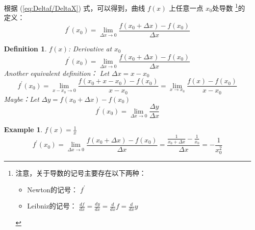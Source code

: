 \documentclass{ctexart}
\numberwithin{equation}{section}
\numberwithin{figure}{section}
\newtheorem{myEx}{Example}[section] %
\newtheorem{myDef}{Definition}[section]
\begin{document}
根据 (\ref{eq:Deltaf/DeltaX}) 式，可以得到，曲线 \(f(x)\) 上任意一点 \(x_0\)处导数
\footnote{注意，关于导数的记号主要存在以下两种：
    \begin{itemize}
        \item Newton的记号：
              \( f^{\prime} \)
        \item Leibniz的记号：
              \( \frac{df}{dx}=\frac{dy}{dx}=\frac{d}{dx}f=\frac{d}{dx}y \)
    \end{itemize}}的定义：
\begin{equation}
    f^{\prime}(x_0) = \lim\limits_{\Delta x \to 0}\frac{f(x_0 + \Delta x) - f(x_0)}{\Delta x}
\end{equation}

\begin{myDef}\label{Def:Derivative}
    \(f(x)\): Derivative at \(x_0\)
    \begin{equation*}
        f^{\prime}(x_0) = \lim\limits_{\Delta x \to 0}\frac{f(x_0 + \Delta x) - f(x_0)}{\Delta x}
    \end{equation*}
    Another equivalent definition：
    Let \(\Delta x = x - x_0\)
    \begin{equation*}
        f^{\prime}(x_0) = \lim\limits_{ x - x_0 \to 0}\frac{f(x_0 +  x - x_0) - f(x_0)}{ x - x_0} = \lim\limits_{ x \to x_0}\frac{f(x) - f(x_0)}{ x - x_0}
    \end{equation*}
    Maybe：Let \(\Delta y = f(x_0 + \Delta x) - f(x_0)\)
    \begin{equation*}
        f^{\prime}(x_0) = \lim\limits_{\Delta x \to 0}\frac{\Delta y}{\Delta x}
    \end{equation*}
\end{myDef}

\begin{myEx}\label{Ex:1/x}
    \quad \( f(x) = \frac{1}{x}\)
    \begin{equation*}
        f^{\prime}(x_0) = \lim \limits_{\Delta x \to 0}\frac{f(x_0 + \Delta x) - f(x_0)}{\Delta x} = \frac{\frac{1}{x_0 + \Delta x} - \frac{1}{x_0}}{\Delta x} = -\frac{1}{x_0^{2}}
    \end{equation*}
\end{myEx}
\end{document}
